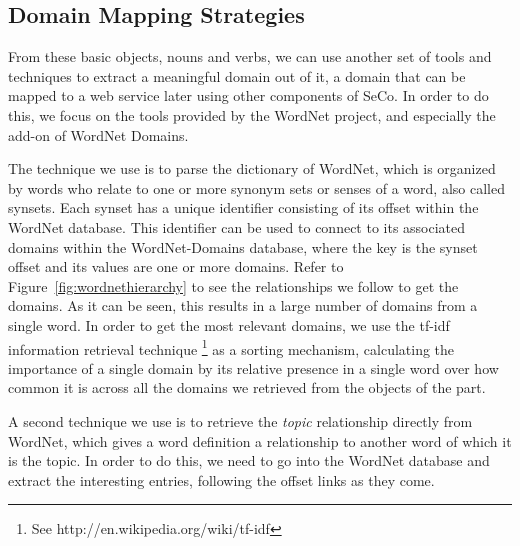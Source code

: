 
\subsection{Domain Mapping Strategies} %
\label{sub:domain_mapping_strategies}

From these basic objects, nouns and verbs, we can use another set of tools and techniques to extract a meaningful domain out of it, a domain that can be mapped to a web service later using other components of SeCo. In order to do this, we focus on the tools provided by the WordNet project, and especially the add-on of WordNet Domains.

The technique we use is to parse the dictionary of WordNet, which is organized by words who relate to one or more synonym sets or senses of a word, also called synsets. Each synset has a unique identifier consisting of its offset within the WordNet database. This identifier can be used to connect to its associated domains within the WordNet-Domains database, where the key is the synset offset and its values are one or more domains. Refer to Figure~\ref{fig:wordnethierarchy} to see the relationships we follow to get the domains. As it can be seen, this results in a large number of domains from a single word. In order to get the most relevant domains, we use the tf-idf information retrieval technique \footnote{See http://en.wikipedia.org/wiki/tf-idf} as a sorting mechanism, calculating the importance of a single domain by its relative presence in a single word over how common it is across all the domains we retrieved from the objects of the part.

A second technique we use is to retrieve the \emph{topic} relationship directly from WordNet, which gives a word definition a relationship to another word of which it is the topic. In order to do this, we need to go into the WordNet database and extract the interesting entries, following the offset links as they come.

